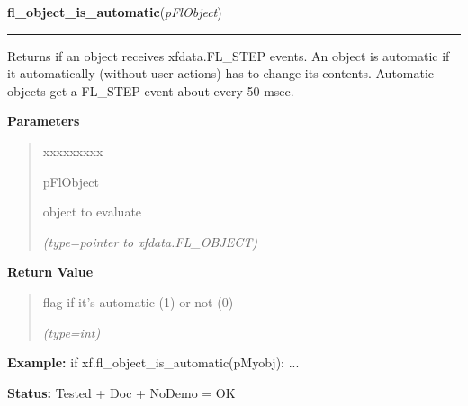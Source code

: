 \hspace{.8\funcindent}\begin{boxedminipage}{\funcwidth}

    \raggedright \textbf{fl\_object\_is\_automatic}(\textit{pFlObject})

    \vspace{-1.5ex}

    \rule{\textwidth}{0.5\fboxrule}
\setlength{\parskip}{2ex}
    Returns if an object receives xfdata.FL\_STEP events. An object is 
    automatic if it automatically (without user actions) has to change its 
    contents. Automatic objects get a FL\_STEP event about every 50 msec.

\setlength{\parskip}{1ex}
      \textbf{Parameters}
      \vspace{-1ex}

      \begin{quote}
        \begin{Ventry}{xxxxxxxxx}

          \item[pFlObject]

          object to evaluate

            {\it (type=pointer to xfdata.FL\_OBJECT)}

        \end{Ventry}

      \end{quote}

      \textbf{Return Value}
    \vspace{-1ex}

      \begin{quote}
      flag if it's automatic (1) or not (0)

      {\it (type=int)}

      \end{quote}

\textbf{Example:} if xf.fl\_object\_is\_automatic(pMyobj): ...



\textbf{Status:} Tested + Doc + NoDemo = OK



    \end{boxedminipage}

    \label{xformslib:flbasic:fl_draw_object_label}

    \vspace{0.5ex}

